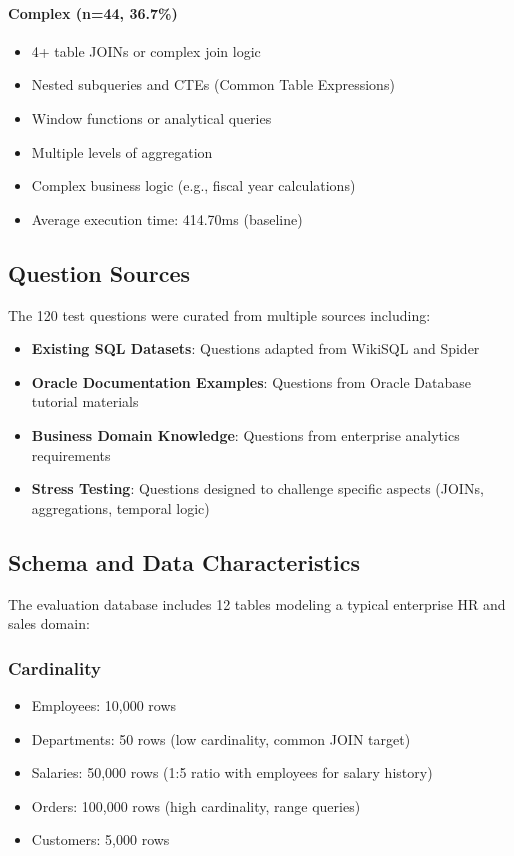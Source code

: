 \paragraph{Complex (n=44, 36.7\%)}
\begin{itemize}
    \item 4+ table JOINs or complex join logic
    \item Nested subqueries and CTEs (Common Table Expressions)
    \item Window functions or analytical queries
    \item Multiple levels of aggregation
    \item Complex business logic (e.g., fiscal year calculations)
    \item Average execution time: 414.70ms (baseline)
\end{itemize}

\subsection{Question Sources}

The 120 test questions were curated from multiple sources including:
\begin{itemize}
    \item \textbf{Existing SQL Datasets}: Questions adapted from WikiSQL and Spider
    \item \textbf{Oracle Documentation Examples}: Questions from Oracle Database tutorial materials
    \item \textbf{Business Domain Knowledge}: Questions from enterprise analytics requirements
    \item \textbf{Stress Testing}: Questions designed to challenge specific aspects (JOINs, aggregations, temporal logic)
\end{itemize}

\subsection{Schema and Data Characteristics}



The evaluation database includes 12 tables modeling a typical enterprise HR and sales domain:

\subsubsection{Cardinality}
\begin{itemize}
    \item Employees: 10,000 rows
    \item Departments: 50 rows (low cardinality, common JOIN target)
    \item Salaries: 50,000 rows (1:5 ratio with employees for salary history)
    \item Orders: 100,000 rows (high cardinality, range queries)
    \item Customers: 5,000 rows
\end{itemize}


